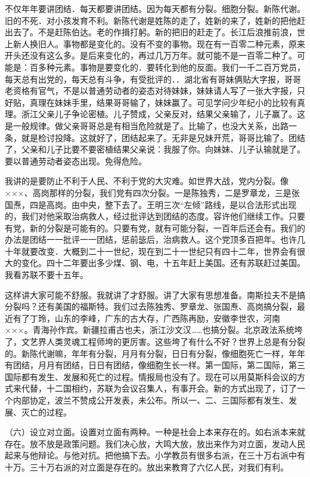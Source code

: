 不仅年年要讲团结．每天都要讲团结。因为每天都有分裂。细胞分裂。新陈代谢。旧的不死．对小孩发育不利。新陈代谢是姓陈的走了，姓新的来了，姓新的把他赶出去了。不是赶陈伯达。老的作揖打躬。新的把旧的赶走了。长江后浪推前浪，世上新人换旧人。事物都是变化的。没有不变的事物。现在有一百零二种元素，原来开头还没有这么多。是后来变化的，再过几万万年。就可能不是一百零二种了。可能是：百多种元素。事物是要变化的．要转化到他的反面。我们一千二百万党员，每天总有出党的，每天总有斗争，有受批评的．．湖北省有哥妹俩贴大字报，哥哥老资格有官气，不是以普通劳动者的姿态对待妹妹，妹妹请人写了一张大字报，只好贴，真理在妹妹手里，结果哥哥输了，妹妹赢了。可见学问少年纪小的比较有真理。浙江父亲儿子争论密植。儿子赞成，父亲反对，结果父亲输了，儿子赢了。这是一般规律。做父亲哥哥总是有相当危险就是了。比输了，也没大关系，出路一条，就是检讨投降。这就好了，团结起来了。无非是兄妹开荒，哥哥比输了。团结了，父亲和儿子比要不要密植结果父亲说：我服了你。向妹妹、儿子认输就是了。要以普通劳动者姿态出现。免得危险。

我讲的是要防止不利于人民、不利于党的大灾难。如世界大战，党内分裂。像×××、高岗那样的分裂，我们党有四次分裂。一是陈独秀，二是罗章龙，三是张国焘，四是高岗。由中央，整下去了。王明三次“左倾”路线，是以合法形式出现的，我们对他采取治病救人，经过批评达到团结的态度。容许他们继续工作。只要有党，新的分裂是可能有的。只要有党，就有可能分裂，一百年后还会有。我们的办法是团结一一批评一一团结，惩前毖后，治病救人。这个党顶多百把年。也许几十年就要改变．大概到二十一世纪，现在到二十一世纪只有四十二年，世界会有很大的变化。四十二年要出多少煤、钢、电，十五年赶上美国。还有苏联赶过美国。我看苏联不要十五年。

这样讲大家可能不舒服。我就讲了才舒服。讲了大家有思想准备。南斯拉夫不是搞分裂吗？还有美国的福斯特。我们过去陈独秀、罗章龙、张国焘、高岗搞分裂，最近有了丁玲，山东的李峰，广东的古大存，广西陈再励，安徽李世农，河南×××。青海孙作宾。新疆拉甫古也夫，浙江沙文汉……也搞分裂。北京政法系统垮了，文艺界人类灵魂工程师垮的更厉害。这些垮了有什么不好？世界上总是有分裂的。新陈代谢嘛，年年有分裂，月月有分裂，日日有分裂，像细胞死亡一样，年年有团结，月月有团结，日日有团结，像细胞生长一样。第一国际，第二国际，第三国际都有发生、发展和死亡的过程。情报局也没有了。现在可以用莫斯科会议的方式来代替，十二国相约，苏联为会议召集人，有事开会。新的方式出现了，订了一个内部协定，波兰不赞成公开发表，未公布。所以一、二、三国际都有发生、发展、灭亡的过程。

（六）设立对立面。设置对立面有两种。一种是社会上本来存在的。如右派本来就存在。放不放是政策问题。我们决心放，大鸣大放，放出来作为对立面，发动人民起来与他辩论。与他对抗。把他搞下去。小学教员有很多右派，在三十万右派中有十万。三十万右派的对立面是存在的。放出来教育了六亿人民，对我们有利。


